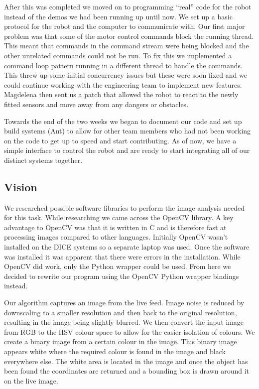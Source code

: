 \documentclass[12pt, a4paper, titlepage]{article}
\begin{document}
After this was completed we moved on to programming ``real'' code for the
robot instead of the demos we had been running up until now. We set up a basic
protocol for the robot and the computer to communicate with. Our first major
problem was that some of the motor control commands block the running thread.
This meant that commands in the command stream were being blocked and the other
unrelated commands could not be run. To fix this we implemented a command loop
pattern running in a different thread to handle the commands. This threw up
some initial concurrency issues but these were soon fixed and we could continue
working with the engineering team to implement new features. Magdelena then sent
us a patch that allowed the robot to react to the newly fitted sensors and move
away from any dangers or obstacles.

Towards the end of the two weeks we began to document our code and set up build
systems (Ant\cite{ant}) to allow for other team members who had not been working
on the code to get up to speed and start contributing. As of now, we have a
simple interface to control the robot and are ready to start integrating all of
our distinct systems together.

\subsection{Vision}

We researched possible software libraries to perform the image analysis needed
for this task. While researching we came across the OpenCV library\cite{opencv}.
A key advantage to OpenCV was that it is written in C and is therefore fast
at processing images compared to other languages. Initially OpenCV wasn't
installed on the DICE systems so a separate laptop was used. Once the software
was installed it was apparent that there were errors in the installation. While
OpenCV did work, only the Python wrapper could be used. From here we decided to
rewrite our program using the OpenCV Python wrapper bindings instead.

Our algorithm captures an image from the live feed. Image noise is reduced by
downscaling to a smaller resolution and then back to the original resolution,
resulting in the image being slightly blurred. We then convert the input image
from RGB to the HSV colour space to allow for the easier isolation of colours.
We create a binary image from a certain colour in the image. This binary
image appears white where the required colour is found in the image and black
everywhere else. The white area is located in the image and once the object has
been found the coordinates are returned and a bounding box is drawn around it on
the live image.
\end{document}
